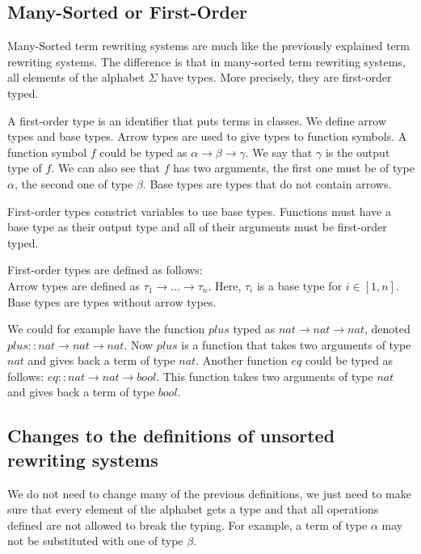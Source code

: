 \subsection{Many-Sorted or First-Order}
Many-Sorted term rewriting systems are much like the previously explained term rewriting systems. The difference is that in many-sorted term rewriting systems, all elements of the alphabet $\Sigma$ have types. More precisely, they are first-order typed. 

A first-order type is an identifier that puts terms in classes. We define arrow types and base types. Arrow types are used to give types to function symbols. A function symbol $f$ could be typed as $\alpha \rightarrow \beta \rightarrow \gamma$. We say that $\gamma$ is the output type of $f$. We can also see that $f$ has two arguments, the first one must be of type $\alpha$, the second one of type $\beta$. Base types are types that do not contain arrows.

First-order types constrict variables to use base types. Functions must have a base type as their output type and all of their arguments must be first-order typed.

\begin{definition}
First-order types are defined as follows: \\
Arrow types are defined as $\tau_1 \rightarrow \dots \rightarrow \tau_n$. Here, $\tau_i$ is a base type for $i \in [1, n]$. Base types are types without arrow types.
\end{definition}

We could for example have the function $plus$ typed as $nat \rightarrow nat \rightarrow nat$, denoted $plus :: nat \rightarrow nat \rightarrow nat$. Now $plus$ is a function that takes two arguments of type $nat$ and gives back a term of type $nat$. Another function $eq$ could be typed as follows: $eq :: nat \rightarrow nat \rightarrow bool$. This function takes two arguments of type $nat$ and gives back a term of type $bool$. 

\subsection{Changes to the definitions of unsorted rewriting systems}
We do not need to change many of the previous definitions, we just need to make sure that every element of the alphabet gets a type and that all operations defined are not allowed to break the typing. For example, a term of type $\alpha$ may not be substituted with one of type $\beta$.
